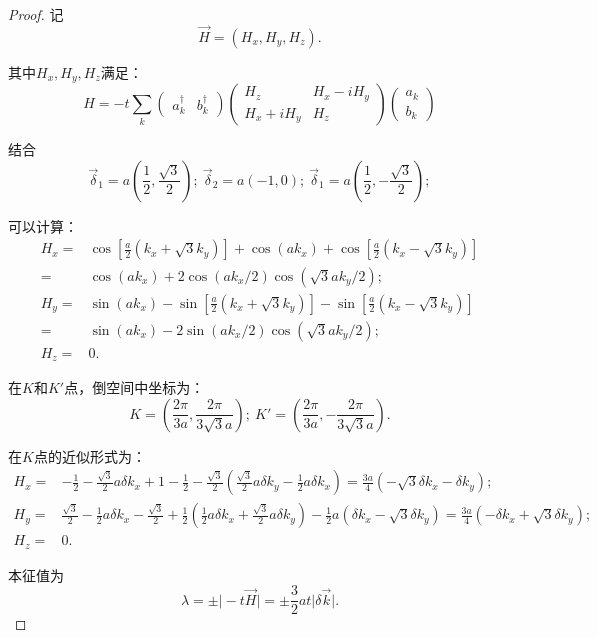 \documentclass[reqno,a4paper,12pt]{amsart}
\begin{document}
\begin{proof}
记
\[
	\vec{H} = (H_x, H_y, H_z).
\]

其中$H_x, H_y, H_z$满足：
\[
	H = -t\sum_k \left( \begin{matrix}
		a_k^\dagger & b_k^\dagger
	\end{matrix} \right) \left( \begin{matrix}
		H_z & H_x-iH_y \\
		H_x+iH_y & H_z
	\end{matrix} \right) \left( \begin{matrix}
		a_k \\
		b_k
	\end{matrix} \right)
\]

结合
\[
	\vec{\delta}_1 = a\left( \frac{1}{2}, \frac{\sqrt{3}}{2} \right); \ \vec{\delta}_2 = a\left( -1, 0 \right); \ \vec{\delta}_1 = a\left( \frac{1}{2}, -\frac{\sqrt{3}}{2} \right);
\]

可以计算：
\begin{align*}
	H_x =& \cos\left[ \frac{a}{2}(k_x + \sqrt{3}k_y) \right] + \cos(ak_x) + \cos\left[ \frac{a}{2}(k_x-\sqrt{3}k_y) \right] \\
	=& \cos(a k_x) + 2\cos(ak_x/2)\cos(\sqrt{3}ak_y/2); \\
	H_y =& \sin(ak_x) - \sin\left[ \frac{a}{2}(k_x + \sqrt{3}k_y) \right] - \sin\left[ \frac{a}{2}(k_x - \sqrt{3}k_y) \right] \\
	=& \sin(ak_x) - 2\sin(ak_x/2)\cos(\sqrt{3}ak_y/2); \\
	H_z =& 0.
\end{align*}

在$K$和$K'$点，倒空间中坐标为：
\[
	K = \left( \frac{2\pi}{3a}, \frac{2\pi}{3\sqrt{3}a} \right); \ K' = \left( \frac{2\pi}{3a}, -\frac{2\pi}{3\sqrt{3}a} \right).
\]

在$K$点的近似形式为：
\begin{align*}
	H_x =& -\frac{1}{2}-\frac{\sqrt{3}}{2}a\delta k_x + 1 -\frac{1}{2}-\frac{\sqrt{3}}{2} \left( \frac{\sqrt{3}}{2}a\delta k_y - \frac{1}{2}a\delta k_x\right) = \frac{3a}{4}(-\sqrt{3}\delta k_x - \delta k_y); \\
	H_y =& \frac{\sqrt{3}}{2}-\frac{1}{2}a\delta k_x - \frac{\sqrt{3}}{2} + \frac{1}{2}\left( \frac{1}{2}a\delta k_x + \frac{\sqrt{3}}{2}a\delta k_y \right) - \frac{1}{2}a(\delta k_x-\sqrt{3}\delta k_y) = \frac{3a}{4} (-\delta k_x + \sqrt{3} \delta k_y); \\
	H_z =& 0.
\end{align*}

本征值为
\[
	\lambda = \pm \vert -t \vec{H} \vert = \pm \frac{3}{2}at\vert \delta \vec{k} \vert.
\]


\end{proof}
\end{document}
